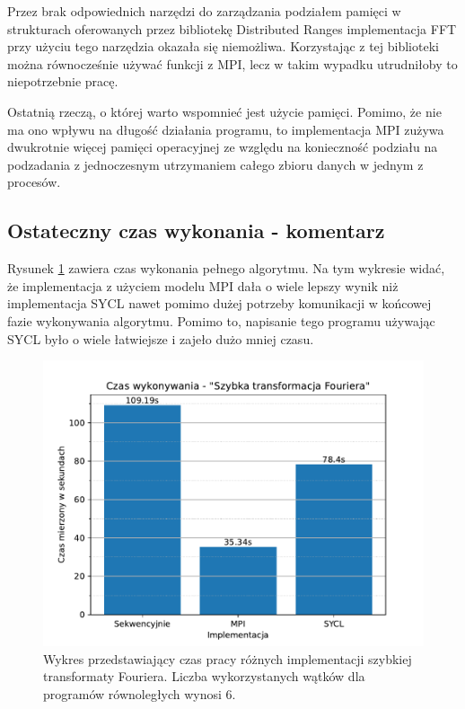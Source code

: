 \documentclass[a4paper,12pt]{book} %
\begin{document}
Przez brak odpowiednich narzędzi do zarządzania podziałem pamięci w strukturach oferowanych przez bibliotekę Distributed Ranges implementacja FFT przy użyciu tego narzędzia okazała się niemożliwa. Korzystając z tej biblioteki można równocześnie używać funkcji z MPI, lecz w takim wypadku utrudniłoby to niepotrzebnie pracę.

Ostatnią rzeczą, o której warto wspomnieć jest użycie pamięci. Pomimo, że nie ma ono wpływu na długość działania programu, to implementacja MPI zużywa dwukrotnie więcej pamięci operacyjnej ze względu na konieczność podziału na podzadania z jednoczesnym utrzymaniem całego zbioru danych w jednym z procesów.

\subsection{Ostateczny czas wykonania - komentarz}
Rysunek \ref{fig:wykonanie-fft} zawiera czas wykonania pełnego algorytmu. Na tym wykresie widać, że implementacja z użyciem modelu MPI dała o wiele lepszy wynik niż implementacja SYCL nawet pomimo dużej potrzeby komunikacji w końcowej fazie wykonywania algorytmu. Pomimo to, napisanie tego programu używając SYCL było o wiele łatwiejsze i zajeło dużo mniej czasu.

\begin{figure}
	\centering
	\includegraphics[scale=0.8]{assets/czas_wykonania_fft.pdf}
	\caption{Wykres przedstawiający czas pracy różnych implementacji szybkiej transformaty Fouriera. Liczba wykorzystanych wątków dla programów równoległych wynosi 6.}
	\label{fig:wykonanie-fft}
\end{figure}
\end{document}

